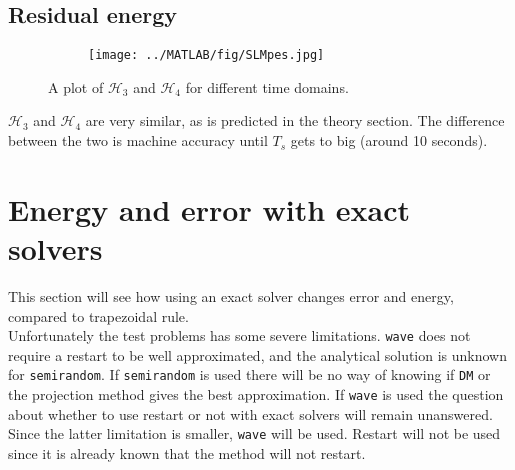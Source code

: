 \subsection{Residual energy}%
\label{sec:residualenergy}
\begin{figure}[H]
        \centering
        \begin{subfigure}[b]{0.45\textwidth}
                \texttt{[image: ../MATLAB/fig/SLMpes.jpg]}
        \end{subfigure}
		
        \caption{ A plot of $\mathcal{H}_3$ and $\mathcal{H}_4$ for different time domains. }
        \label{fig:SLMpes}
\end{figure}
$\mathcal{H}_3$ and $\mathcal{H}_4$ are very similar, as is predicted in the theory section. The difference between the two is machine accuracy until $T_s$ gets to big (around 10 seconds). \\
\section{Energy and error with exact solvers} %
\label{sec:diag}
This section will see how using an exact solver changes error and energy, compared to trapezoidal rule.\\

\noindent Unfortunately the test problems has some severe limitations. \texttt{wave} does not require a restart to be well approximated, and the analytical solution is unknown for \texttt{semirandom}. 
If \texttt{semirandom} is used there will be no way of knowing if \texttt{DM} or the projection method gives the best approximation.
If \texttt{wave} is used the question about whether to use restart or not with exact solvers will remain unanswered. 
Since the latter limitation is smaller,
\texttt{wave} will be used. Restart will not be used since it is already known that the method will not restart.

